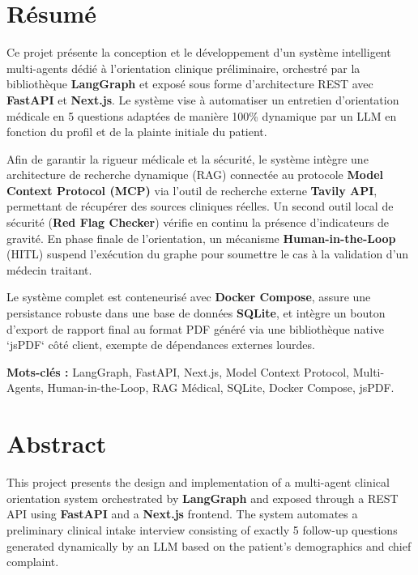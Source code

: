 \documentclass[11pt,a4paper]{report}
\begin{document}
\section*{Résumé}

Ce projet présente la conception et le développement d'un système intelligent multi-agents dédié à l'orientation clinique préliminaire, orchestré par la bibliothèque \textbf{LangGraph} et exposé sous forme d'architecture REST avec \textbf{FastAPI} et \textbf{Next.js}. Le système vise à automatiser un entretien d'orientation médicale en 5 questions adaptées de manière 100\% dynamique par un LLM en fonction du profil et de la plainte initiale du patient. 

Afin de garantir la rigueur médicale et la sécurité, le système intègre une architecture de recherche dynamique (RAG) connectée au protocole \textbf{Model Context Protocol (MCP)} via l'outil de recherche externe \textbf{Tavily API}, permettant de récupérer des sources cliniques réelles. Un second outil local de sécurité (\textbf{Red Flag Checker}) vérifie en continu la présence d'indicateurs de gravité. En phase finale de l'orientation, un mécanisme \textbf{Human-in-the-Loop} (HITL) suspend l'exécution du graphe pour soumettre le cas à la validation d'un médecin traitant. 

Le système complet est conteneurisé avec \textbf{Docker Compose}, assure une persistance robuste dans une base de données \textbf{SQLite}, et intègre un bouton d'export de rapport final au format PDF généré via une bibliothèque native `jsPDF` côté client, exempte de dépendances externes lourdes.

\vspace{0.5cm}
\textbf{Mots-clés :} LangGraph, FastAPI, Next.js, Model Context Protocol, Multi-Agents, Human-in-the-Loop, RAG Médical, SQLite, Docker Compose, jsPDF.

\newpage

\section*{Abstract}

This project presents the design and implementation of a multi-agent clinical orientation system orchestrated by \textbf{LangGraph} and exposed through a REST API using \textbf{FastAPI} and a \textbf{Next.js} frontend. The system automates a preliminary clinical intake interview consisting of exactly 5 follow-up questions generated dynamically by an LLM based on the patient's demographics and chief complaint.
\end{document}
